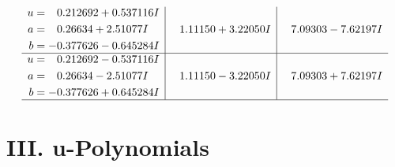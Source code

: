 \documentclass[1p]{elsarticle_modified}
\theoremstyle{definition}
\begin{document}
$$\begin{array}{c|c|c}
\begin{aligned}
u &= \phantom{-}0.212692 + 0.537116 I \\
a &= \phantom{-}0.26634 + 2.51077 I \\
b &= -0.377626 - 0.645284 I\end{aligned}
 & \phantom{-}1.11150 + 3.22050 I & \phantom{-}7.09303 - 7.62197 I \\ \hline\begin{aligned}
u &= \phantom{-}0.212692 - 0.537116 I \\
a &= \phantom{-}0.26634 - 2.51077 I \\
b &= -0.377626 + 0.645284 I\end{aligned}
 & \phantom{-}1.11150 - 3.22050 I & \phantom{-}7.09303 + 7.62197 I\\
 \hline 
 \end{array}$$\newpage
\newpage\renewcommand{\arraystretch}{1}
\centering \section*{ III. u-Polynomials}
\end{document}
